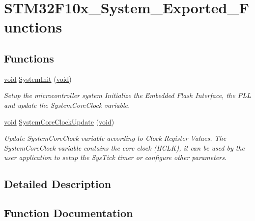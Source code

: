 \hypertarget{group___s_t_m32_f10x___system___exported___functions}{}\section{S\+T\+M32\+F10x\+\_\+\+System\+\_\+\+Exported\+\_\+\+Functions}
\label{group___s_t_m32_f10x___system___exported___functions}
\subsection*{Functions}
\begin{DoxyCompactItemize}
\item 
\hyperlink{usb__devapi_8h_afabf60e7f57651d6d595a02c75f07cd0}{void} \hyperlink{group___s_t_m32_f10x___system___exported___functions_ga93f514700ccf00d08dbdcff7f1224eb2}{System\+Init} (\hyperlink{usb__devapi_8h_afabf60e7f57651d6d595a02c75f07cd0}{void})
\begin{DoxyCompactList}\small\item\em Setup the microcontroller system Initialize the Embedded Flash Interface, the P\+LL and update the System\+Core\+Clock variable. \end{DoxyCompactList}\item 
\hyperlink{usb__devapi_8h_afabf60e7f57651d6d595a02c75f07cd0}{void} \hyperlink{group___s_t_m32_f10x___system___exported___functions_gae0c36a9591fe6e9c45ecb21a794f0f0f}{System\+Core\+Clock\+Update} (\hyperlink{usb__devapi_8h_afabf60e7f57651d6d595a02c75f07cd0}{void})
\begin{DoxyCompactList}\small\item\em Update System\+Core\+Clock variable according to Clock Register Values. The System\+Core\+Clock variable contains the core clock (H\+C\+LK), it can be used by the user application to setup the Sys\+Tick timer or configure other parameters. \end{DoxyCompactList}\end{DoxyCompactItemize}


\subsection{Detailed Description}


\subsection{Function Documentation}
